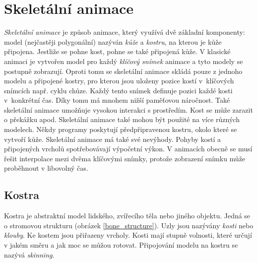 \chapter{Skeletální animace}
\textit{Skeletální animace} je způsob animace, který využívá dvě základní komponenty: model (nejčastěji polygonální) nazýván \textit{kůže} a \textit{kostru}, na kterou je kůže připojena. Jestliže se pohne kost, pohne se také připojená kůže. V klasické animaci je vytvořen model pro každý \textit{klíčový snímek} animace a tyto modely se postupně zobrazují. Oproti tomu se skeletální animace skládá pouze z jednoho modelu a připojené kostry, pro kterou jsou uloženy pozice kostí v~klíčových snímcích např. cyklu chůze. Každý tento snímek definuje pozici každé kosti v~konkrétní čas. Díky tomu má mnohem nižší paměťovou náročnost. Také skeletální animace umožňuje vysokou interakci s prostředím. Kost se může zarazit o překážku apod. Skeletální animace také mohou být použité na více různých modelech. Někdy programy poskytují předpřipravenou kostru, okolo které se vytvoří kůže. Skeletální animace má také své nevýhody. Pohyby kostí a připojených vrcholů spotřebovávají výpočetní výkon. V animacích obecně se musí řešit interpolace mezi dvěma klíčovými snímky, protože zobrazení snímku může proběhnout v libovolný čas.
\section{Kostra}
Kostra je abstraktní model lidského, zvířecího těla nebo jiného objektu. Jedná se o stromovou strukturu (obrázek \ref{bone_structure}). Uzly jsou nazývány \textit{kosti} nebo \textit{klouby}. Ke kostem jsou přiřazeny vrcholy. Kosti mají stupně volnosti, které určují v jakém směru a jak moc se můžou rotovat. Připojování modelu na kostru se nazývá \textit{skinning}.

